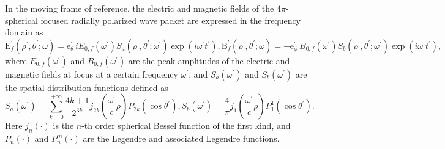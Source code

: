 \documentclass[10pt, a4paper, twoside, openright]{report}
\renewcommand{\vec}[1]{\boldsymbol{\mathrm{#1}}}
\begin{document}
In the moving frame of reference, the electric and magnetic fields of the $ 4 \pi $-spherical focused radially polarized wave packet are expressed in the frequency domain as \cite{Jeong2020, Jeong2021}
\begin{subequations}
\begin{equation}\label{key}
\vec{E}^{\prime}_{f} \left( \rho^{\prime}, \theta^{\prime}; \omega \right) = \vec{e}_{\theta}^{\prime} \, i E_{0, f} \left( \omega^{\prime} \right) S_a \left( \rho^{\prime}, \theta^{\prime}; \omega^{\prime} \right) \exp \left(i \omega^{\prime} t^{\prime} \right),
\end{equation}
\begin{equation}\label{key}
\vec{B}^{\prime}_{f} \left( \rho^{\prime}, \theta^{\prime}; \omega \right) = - \vec{e}_{\phi}^{\prime} \, B_{0, f} \left( \omega^{\prime} \right) S_b \left( \rho^{\prime}, \theta^{\prime}; \omega^{\prime} \right) \exp \left(i \omega^{\prime} t^{\prime} \right),
\end{equation}
\end{subequations}
where $ E_{0, f} \left( \omega^{\prime} \right) $ and $ B_{0, f} \left( \omega^{\prime} \right) $ are the peak amplitudes of the electric and magnetic fields at focus at a certain frequency $ \omega^{\prime} $, and $ S_a \left( \omega^{\prime} \right) $ and $ S_b \left( \omega^{\prime} \right) $ are the spatial distribution functions defined as
\begin{subequations}
	\begin{equation}\label{key}
S_a \left( \omega^{\prime} \right) = \sum_{k = 0}^{+\infty} \frac{4k + 1}{2^{3k}} j_{2k} \left( \frac{\omega^{\prime}}{c} \rho \right) P_{2k} \left( \cos \theta^{\prime} \right),
	\end{equation}
	\begin{equation}\label{key}
S_b \left( \omega^{\prime} \right) = \frac{4}{\pi} j_1 \left( \frac{\omega^{\prime}}{c} \rho \right) P^1_1 \left( \cos \theta^{\prime} \right).
	\end{equation}
\end{subequations}
Here $ j_{n} \left( \cdot \right) $ is the $ n $-th order spherical Bessel function of the first kind, and $ P_n \left( \cdot \right) $ and $ P^m_n \left( \cdot \right) $ are the Legendre and associated Legendre functions.
\end{document}
